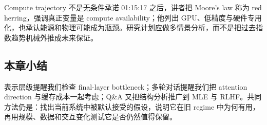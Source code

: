 \begin{warningbox}{Compute trajectory 不是无条件承诺}
01:15:17 之后，讲者把 Moore's law 称为 red herring，强调真正变量是 compute availability；他列出 GPU、低精度与硬件专用化，也承认能源和物理可能成为瓶颈。研究计划应做多情景分析，而不是把过去指数趋势机械外推成未来保证。
\end{warningbox}

\subsection{本章小结}

表示层级提醒我们检查 final-layer bottleneck；多轮对话提醒我们把 attention direction 与缓存成本一起考虑；Q\&A 又把结构分析推广到 MLE 与 RLHF。共同方法仍是：找出当前系统中被默认接受的假设，说明它在旧 regime 中为何有用，再用规模、数据和交互变化测试它是否仍然值得保留。

